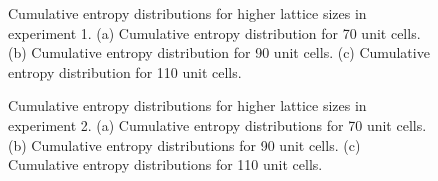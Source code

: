 \documentclass[10pt]{revtex4-1}
\newcommand\SSHOneCumulativeEntropyOneFourZero{./supp_ssh1_140_plot_cumulative_feature_importances.png}
\newcommand\SSHOneCumulativeEntropyOneEightZero{./supp_ssh1_180_plot_cumulative_feature_importances.png}
\newcommand\SSHOneCumulativeEntropyTwoTwoZero{./supp_ssh1_220_plot_cumulative_feature_importances.png}
\newcommand\SSHTwoCumulativeEntropyOneFourZero{./supp_ssh2_140_plot_cumulative_feature_importances.png}
\newcommand\SSHTwoCumulativeEntropyOneEightZero{./supp_ssh2_180_plot_cumulative_feature_importances.png}
\newcommand\SSHTwoCumulativeEntropyTwoTwoZero{./supp_ssh2_220_plot_cumulative_feature_importances.png}
\begin{document}
\pagebreak 

\begin{figure}
\centering
{}
\caption{Cumulative entropy distributions for higher lattice sizes in experiment 1. (a) Cumulative entropy distribution for 70 unit cells. (b) Cumulative entropy distribution for 90 unit cells. (c) Cumulative entropy distribution for 110 unit cells.}
\label{cdf1}
\end{figure}

\begin{figure}
\centering
{}
\caption{Cumulative entropy distributions for higher lattice sizes in experiment 2. (a) Cumulative entropy distributions for 70 unit cells. (b) Cumulative entropy distributions for 90 unit cells. (c) Cumulative entropy distributions for 110 unit cells.}
\label{cdf2}
\end{figure}

{}
\end{document}
